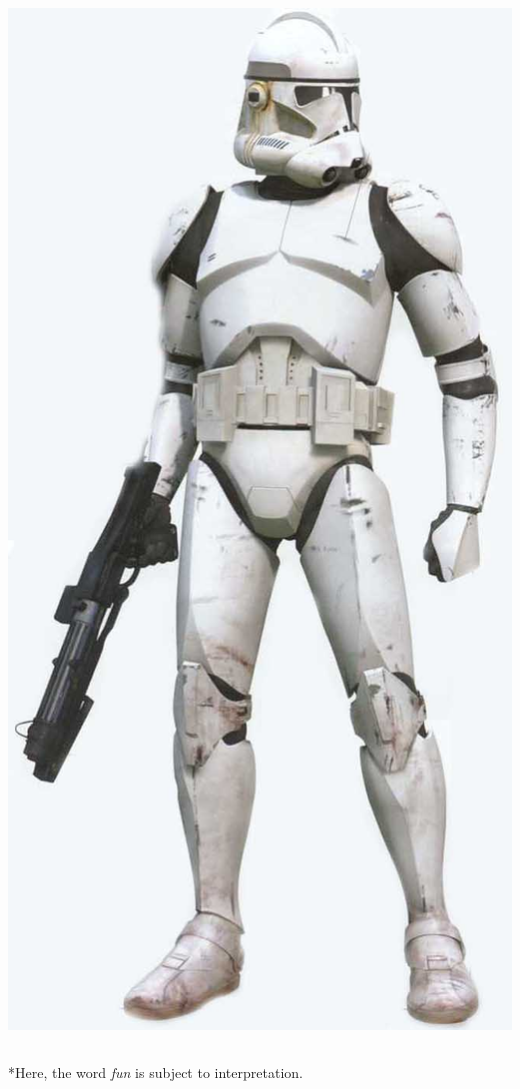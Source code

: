 \documentclass{beamer}
\begin{document}
\begin{frame}
\begin{columns}
\includegraphics[width=\textwidth]{clone.jpg}
\end{columns}

*Here, the word \textit{fun} is subject to interpretation.
\end{frame}
\end{document}
